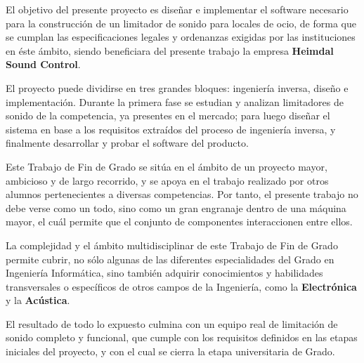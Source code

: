 \begin{singlespace}
    \noindent El objetivo del presente proyecto es diseñar e implementar el software necesario para la construcción de un limitador de sonido para locales de ocio, de forma que se cumplan las especificaciones legales y ordenanzas exigidas por las instituciones en éste ámbito, siendo beneficiara del presente trabajo la empresa \textbf{Heimdal Sound Control}.

    \noindent El proyecto puede dividirse en tres grandes bloques: ingeniería inversa, diseño e implementación. Durante la primera fase se estudian y analizan limitadores de sonido de la competencia, ya presentes en el mercado; para luego diseñar el sistema en base a los requisitos extraídos del proceso de ingeniería inversa, y finalmente desarrollar y probar el software del producto.

    \noindent Este Trabajo de Fin de Grado se sitúa en el ámbito de un proyecto mayor, ambicioso y de largo recorrido, y se apoya en el trabajo realizado por otros alumnos pertenecientes a diversas competencias. Por tanto, el presente trabajo no debe verse como un todo, sino como un gran engranaje dentro de una máquina mayor, el cuál permite que el conjunto de componentes interaccionen entre ellos.

    \noindent La complejidad y el ámbito multidisciplinar de este Trabajo de Fin de Grado permite cubrir, no sólo algunas de las diferentes especialidades del Grado en Ingeniería Informática, sino también adquirir conocimientos y habilidades transversales o específicos de otros campos de la Ingeniería, como la \textbf{Electrónica} y la \textbf{Acústica}.

    \noindent El resultado de todo lo expuesto culmina con un equipo real de limitación de sonido completo y funcional, que cumple con los requisitos definidos en las etapas iniciales del proyecto, y con el cual se cierra la etapa universitaria de Grado.
\end{singlespace}

\vspace{1.25cm}
\newpage
\vspace{-1.15cm}

